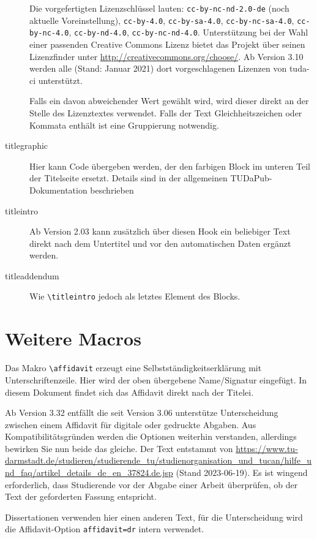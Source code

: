 \documentclass[
	ngerman,
	ruledheaders=section,%
	class=report,%
	thesis={type=bachelor},%
	accentcolor=9c,%
	custommargins=true,%
	marginpar=false,%
	parskip=half-,%
	fontsize=11pt,%
]{tudapub}
\let\code\texttt
\let\tbs\textbackslash
\begin{document}
\begin{description}
	Die vorgefertigten Lizenzschlüssel lauten: \verb+cc-by-nc-nd-2.0-de+ (noch aktuelle Voreinstellung), \verb+cc-by-4.0+, \verb+cc-by-sa-4.0+, \verb+cc-by-nc-sa-4.0+, \verb+cc-by-nc-4.0+, \verb+cc-by-nd-4.0+, \verb+cc-by-nc-nd-4.0+.
	Unterstützung bei der Wahl einer passenden Creative Commons Lizenz bietet das Projekt über seinen Lizenzfinder unter \url{http://creativecommons.org/choose/}.
	Ab Version 3.10 werden alle (Stand: Januar 2021) dort vorgeschlagenen Lizenzen von tuda-ci unterstützt.

	Falls ein davon abweichender Wert gewählt wird, wird dieser direkt an der Stelle des Lizenztextes verwendet. Falls der Text Gleichheitszeichen oder Kommata enthält ist eine Gruppierung notwendig.
	\item[titlegraphic] Hier kann Code übergeben werden, der den farbigen Block im unteren Teil der Titelseite ersetzt. Details sind in der allgemeinen TUDaPub-Dokumentation beschrieben \cite{tudapub}
	\item[titleintro] Ab Version 2.03 kann zusätzlich über diesen Hook ein beliebiger Text direkt nach dem Untertitel und vor den automatischen Daten ergänzt werden.
	\item[titleaddendum] Wie \code{\tbs{}titleintro} jedoch als letztes Element des Blocks.
\end{description}

\section{Weitere Macros}
Das Makro \verb+\affidavit+ erzeugt eine Selbstständigkeitserklärung mit Unterschriftenzeile. Hier wird der oben übergebene Name/Signatur eingefügt.
In diesem Dokument findet sich das Affidavit direkt nach der Titelei.

Ab Version 3.32 entfällt die seit Version 3.06 unterstütze Unterscheidung zwischen einem Affidavit für digitale oder gedruckte Abgaben. Aus Kompatibilitätsgründen werden die Optionen weiterhin verstanden, allerdings bewirken Sie nun beide das gleiche. Der Text entstammt von  \url{https://www.tu-darmstadt.de/studieren/studierende_tu/studienorganisation_und_tucan/hilfe_und_faq/artikel_details_de_en_37824.de.jsp} (Stand 2023-06-19). Es ist wingend erforderlich, dass Studierende vor der Abgabe einer Arbeit überprüfen, ob der Text der geforderten Fassung entspricht.

Dissertationen verwenden hier einen anderen Text, für die Unterscheidung wird die Affidavit-Option \verb+affidavit=dr+ intern verwendet.
\end{document}
